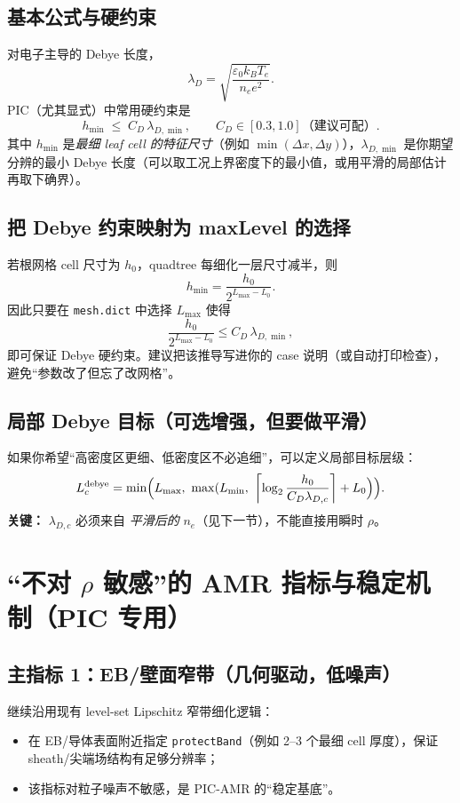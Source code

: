 \documentclass[UTF8,11pt,a4paper]{ctexart}
\begin{document}
\subsection{基本公式与硬约束}
对电子主导的 Debye 长度，
\begin{equation}
\lambda_D = \sqrt{\frac{\varepsilon_0 k_B T_e}{n_e e^2}}.
\end{equation}
PIC（尤其显式）中常用硬约束是
\begin{equation}
h_{\min} \;\le\; C_D\,\lambda_{D,\min},
\qquad C_D \in [0.3,1.0] \text{（建议可配）}.
\end{equation}
其中 $h_{\min}$ 是\emph{最细 leaf cell 的特征尺寸}（例如 $\min(\Delta x,\Delta y)$），$\lambda_{D,\min}$ 是你期望分辨的最小 Debye 长度（可以取工况上界密度下的最小值，或用平滑的局部估计再取下确界）。

\subsection{把 Debye 约束映射为 maxLevel 的选择}
若根网格 cell 尺寸为 $h_0$，quadtree 每细化一层尺寸减半，则
\begin{equation}
h_{\min} = \frac{h_0}{2^{L_{\max}-L_0}}.
\end{equation}
因此只要在 \texttt{mesh.dict} 中选择 $L_{\max}$ 使得
\begin{equation}
\frac{h_0}{2^{L_{\max}-L_0}} \le C_D\,\lambda_{D,\min},
\end{equation}
即可保证 Debye 硬约束。建议把该推导写进你的 case 说明（或自动打印检查），避免“参数改了但忘了改网格”。

\subsection{局部 Debye 目标（可选增强，但要做平滑）}
如果你希望“高密度区更细、低密度区不必追细”，可以定义局部目标层级：
\begin{equation}
L^{\mathrm{debye}}_c
=
\min\Bigl(L_{\max},\ \max(L_{\min},\ \left\lceil \log_2\frac{h_0}{C_D\lambda_{D,c}}\right\rceil + L_0 \Bigr)\Bigr).
\end{equation}
\textbf{关键：} $\lambda_{D,c}$ 必须来自 \emph{平滑后的} $n_e$（见下一节），不能直接用瞬时 $\rho$。

\section{“不对 $\rho$ 敏感”的 AMR 指标与稳定机制（PIC 专用）}
\subsection{主指标 1：EB/壁面窄带（几何驱动，低噪声）}
继续沿用现有 level-set Lipschitz 窄带细化逻辑：
\begin{itemize}[leftmargin=1.6em]
  \item 在 EB/导体表面附近指定 \texttt{protectBand}（例如 2--3 个最细 cell 厚度），保证 sheath/尖端场结构有足够分辨率；
  \item 该指标对粒子噪声不敏感，是 PIC-AMR 的“稳定基底”。
\end{itemize}
\end{document}
